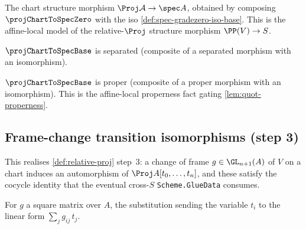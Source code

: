 \begin{definition}

  \label{def:projchart-to-specbase}
  The chart structure morphism $\Proj\mathcal A \to \spec A$, obtained by
  composing $\projChartToSpecZero$ with the iso
  \cref{def:spec-gradezero-iso-base}. This is the affine-local model of the
  relative-$\Proj$ structure morphism $\PP(V) \to S$.
\end{definition}

\begin{lemma}

  \label{lem:projchart-base-separated}
  $\projChartToSpecBase$ is separated (composite of a separated morphism with an
  isomorphism).
\end{lemma}

\begin{lemma}

  \label{lem:projchart-base-proper}
  $\projChartToSpecBase$ is proper (composite of a proper morphism with an
  isomorphism). This is the affine-local properness fact gating
  \cref{lem:quot-properness}.
\end{lemma}

\subsection{Frame-change transition isomorphisms (step 3)}
This realises \cref{def:relative-proj} step~3: a change of frame
$g\in\GL_{n+1}(A)$ of $V$ on a chart induces an automorphism of
$\Proj A[t_0,\dots,t_n]$, and these satisfy the cocycle identity that the
eventual cross-$S$ \texttt{Scheme.GlueData} consumes.

\begin{definition}

  \label{def:projchart-frame-subst}
  For $g$ a square matrix over $A$, the substitution sending the variable $t_i$ to
  the linear form $\sum_j g_{ij}\,t_j$.
\end{definition}

